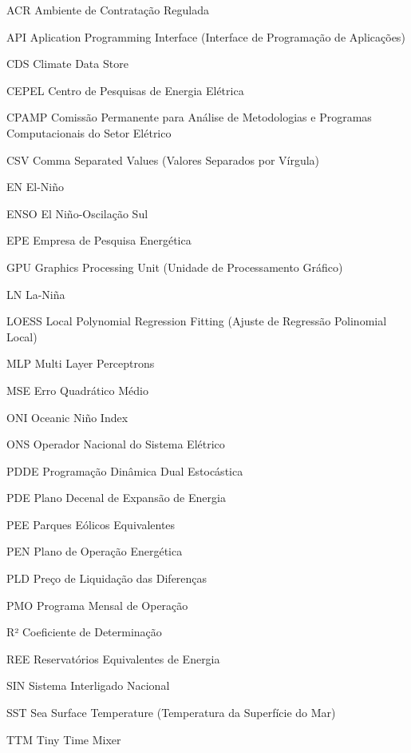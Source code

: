\documentclass[
  12pt,				                                                                                                          %
  oneside,                                                                                                              %
  a4paper,			                                                                                                        %
  chapter = Title,		                                                                                                  %
  section = Title,		                                                                                                  %
  subsection = Title,	                                                                                                  %
  english,			                                                                                                        %
  brazil,			                                                                                                          %
  sumario = tradicional
  ]{abntex2-uff}
\begin{document}
\begin{siglas}
  \item[ACR] Ambiente de Contratação Regulada
  \item[API] Aplication Programming Interface (Interface de Programação de Aplicações)
  \item[CDS] Climate Data Store
  \item[CEPEL] Centro de Pesquisas de Energia Elétrica
  \item[CPAMP] Comissão Permanente para Análise de Metodologias e Programas Computacionais do Setor Elétrico
  \item[CSV] Comma Separated Values (Valores Separados por Vírgula)
  \item[EN] El-Niño
  \item[ENSO] El Niño-Oscilação Sul
  \item[EPE] Empresa de Pesquisa Energética
  \item[GPU] Graphics Processing Unit (Unidade de Processamento Gráfico)
  \item[LN] La-Niña
  \item[LOESS] Local Polynomial Regression Fitting (Ajuste de Regressão Polinomial Local)
  \item[MLP] Multi Layer Perceptrons
  \item[MSE] Erro Quadrático Médio
  \item[ONI] Oceanic Niño Index
  \item[ONS] Operador Nacional do Sistema Elétrico
  \item[PDDE] Programação Dinâmica Dual Estocástica
  \item[PDE] Plano Decenal de Expansão de Energia
  \item[PEE] Parques Eólicos Equivalentes
  \item[PEN] Plano de Operação Energética
  \item[PLD] Preço de Liquidação das Diferenças
  \item[PMO] Programa Mensal de Operação
  \item[R²] Coeficiente de Determinação
  \item[REE] Reservatórios Equivalentes de Energia
  \item[SIN] Sistema Interligado Nacional
  \item[SST] Sea Surface Temperature (Temperatura da Superfície do Mar)
  \item[TTM] Tiny Time Mixer
\end{siglas}
\end{document}
